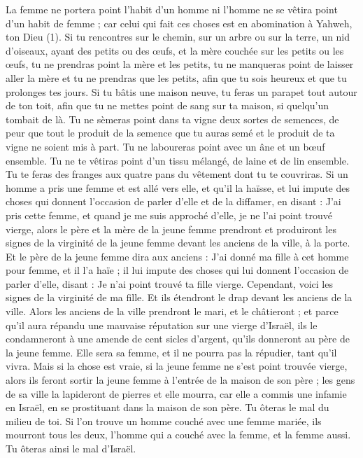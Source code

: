\begin{multicols}{2}
La femme ne portera point l'habit d'un homme ni l'homme ne se vêtira point d'un habit de femme ; car celui qui fait ces choses est en abomination à Yahweh, ton Dieu (1).
Si tu rencontres sur le chemin, sur un arbre ou sur la terre, un nid d'oiseaux, ayant des petits ou des œufs, et la mère couchée sur les petits ou les œufs, tu ne prendras point la mère et les petits,
tu ne manqueras point de laisser aller la mère et tu ne prendras que les petits, afin que tu sois heureux et que tu prolonges tes jours.
Si tu bâtis une maison neuve, tu feras un parapet tout autour de ton toit, afin que tu ne mettes point de sang sur ta maison, si quelqu'un tombait de là.
Tu ne sèmeras point dans ta vigne deux sortes de semences, de peur que tout le produit de la semence que tu auras semé et le produit de ta vigne ne soient mis à part.
Tu ne laboureras point avec un âne et un bœuf ensemble.
Tu ne te vêtiras point d'un tissu mélangé, de laine et de lin ensemble.
Tu te feras des franges aux quatre pans du vêtement dont tu te couvriras.
Si un homme a pris une femme et est allé vers elle, et qu’il la haïsse,
et lui impute des choses qui donnent l’occasion de parler d’elle et de la diffamer, en disant : J'ai pris cette femme, et quand je me suis approché d'elle, je ne l'ai point trouvé vierge,
alors le père et la mère de la jeune femme prendront et produiront les signes de la virginité de la jeune femme devant les anciens de la ville, à la porte.
Et le père de la jeune femme dira aux anciens : J'ai donné ma fille à cet homme pour femme, et il l'a haïe ;
il lui impute des choses qui lui donnent l’occasion de parler d’elle, disant : Je n'ai point trouvé ta fille vierge. Cependant, voici les signes de la virginité de ma fille. Et ils étendront le drap devant les anciens de la ville.
Alors les anciens de la ville prendront le mari, et le châtieront ;
et parce qu'il aura répandu une mauvaise réputation sur une vierge d'Israël, ils le condamneront à une amende de cent sicles d'argent, qu’ils donneront au père de la jeune femme. Elle sera sa femme, et il ne pourra pas la répudier, tant qu'il vivra.
Mais si la chose est vraie, si la jeune femme ne s’est point trouvée vierge,
alors ils feront sortir la jeune femme à l’entrée de la maison de son père ; les gens de sa ville la lapideront de pierres et elle mourra, car elle a commis une infamie en Israël, en se prostituant dans la maison de son père. Tu ôteras le mal du milieu de toi.
Si l’on trouve un homme couché avec une femme mariée, ils mourront tous les deux, l'homme qui a couché avec la femme, et la femme aussi. Tu ôteras ainsi le mal d'Israël.

\end{multicols}
